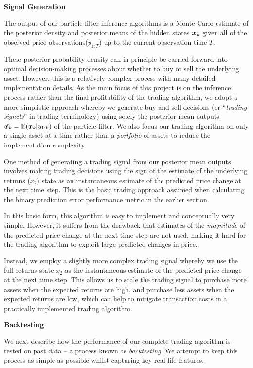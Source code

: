 \documentclass[../main.tex]{subfiles}
\begin{document}
	
\textbf{Signal Generation}
	
The output of our particle filter inference algorithms is a Monte Carlo estimate of the posterior density and posterior means of the hidden states $\bm{x}_k$ given all of the observed price observations($y_{1:T}$) up to the current observation time $T$. 

These posterior probability density can in principle be carried forward into optimal decision-making processes about whether to buy or sell the underlying asset. However, this is a relatively complex process with many detailed implementation details. As the main focus of this project is on the inference process rather than the final profitability of the trading algorithm, we adopt a more simplistic approach whereby we generate buy and sell decisions (or ``\textit{trading signals}'' in trading terminology) using solely the posterior mean outputs $\hat{ \bm{x}_{k}} = \mathbb{E}( \bm{x}_{k} | y_{1:k})$ of the particle filter. We also focus our trading algorithm on only a single asset at a time rather than a \textit{portfolio} of assets to reduce the implementation complexity.

One method of generating a trading signal from our posterior mean outputs involves making trading decisions using the sign of the estimate of the underlying returns ($x_2$) state as an instantaneous estimate of the predicted price change at the next time step. This is the basic trading approach assumed when calculating the binary prediction error performance metric in the earlier section. 

In this basic form, this algorithm is easy to implement and conceptually very simple. However, it suffers from the drawback that estimates of the \textit{magnitude} of the predicted price change at the next time step are not used, making it hard for the trading algorithm to exploit large predicted changes in price. 

Instead, we employ a slightly more complex trading signal whereby we use the full returns state $x_2$ as the instantaneous estimate of the predicted price change at the next time step. This allows us to scale the trading signal to purchase more assets when the expected returns are high, and purchase less assets when the expected returns are low, which can help to mitigate transaction costs in a practically implemented trading algorithm. 

\textbf{Backtesting}

We next describe how the performance of our complete trading algorithm is tested on past data -- a process known as \textit{backtesting}. We attempt to keep this process as simple as possible whilst capturing key real-life features. 
\end{document}
